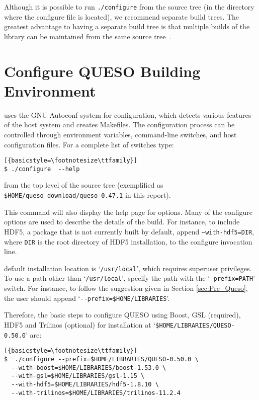 Although it is possible to run \verb+./configure+ from the source tree (in the directory where the configure file is located), we recommend separate build trees. The greatest advantage to having a separate build tree is that multiple builds of the library
can be maintained from the same source tree~\cite{Trilinos}. 


\section{Configure QUESO Building Environment}\label{sec:Queso_configure}

\Queso{} uses the GNU Autoconf system for configuration, which detects various features of the host system and creates Makefiles. 
The configuration process can be controlled through environment variables, command-line switches, and host configuration files.
For a complete list of switches type:
\begin{lstlisting}[{basicstyle=\footnotesize\ttfamily}]
$ ./configure  --help  
\end{lstlisting}
%
from the top level of the source tree (exemplified as \verb+$HOME/queso_download/queso-0.47.1+ in this report). 

This command will also display the help page for \Queso{} options.  Many of the \Queso{} configure options are used to describe 
the details of the build. For instance, to include HDF5, a package that is not currently built by default, append \texttt{--with-hdf5=DIR}, 
where \texttt{DIR} is the root directory of HDF5 installation,  to the configure invocation line. 

\Queso{} default installation location is `\texttt{/usr/local}', which requires superuser privileges. To use a path
 other than `\texttt{/usr/local}', specify the path with the `\texttt{--prefix=PATH}' switch. For instance, to follow the suggestion
 given in Section \ref{sec:Pre_Queso}, the user should append `\verb+--prefix=$HOME/LIBRARIES+'.



Therefore, the basic steps to configure QUESO using Boost, GSL (required), HDF5 and Trilinos (optional) for installation at `\verb+$HOME/LIBRARIES/QUESO-0.50.0+' are:
\begin{lstlisting}[{basicstyle=\footnotesize\ttfamily}]
$  ./configure --prefix=$HOME/LIBRARIES/QUESO-0.50.0 \
  --with-boost=$HOME/LIBRARIES/boost-1.53.0 \
  --with-gsl=$HOME/LIBRARIES/gsl-1.15 \
  --with-hdf5=$HOME/LIBRARIES/hdf5-1.8.10 \
  --with-trilinos=$HOME/LIBRARIES/trilinos-11.2.4
  \end{lstlisting}

